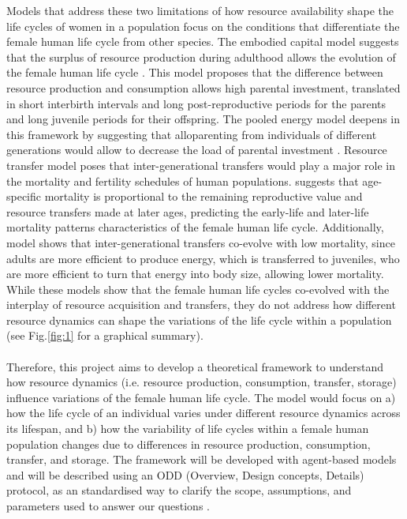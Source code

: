 \documentclass{article}
\begin{document}
Models that address these two limitations of how resource availability shape the life cycles of women in a population focus on the conditions that differentiate the female human life cycle from other species. The embodied capital model suggests that the surplus of resource production during adulthood allows the evolution of the female human life cycle \citep{kaplan2000theory}. This model proposes that the difference between resource production and consumption allows high parental investment, translated in short interbirth intervals and long post-reproductive periods for the parents and long juvenile periods for their offspring. The pooled energy model deepens in this framework by suggesting that alloparenting from individuals of different generations would allow to decrease the load of parental investment \citep{kramer2010pooled}. Resource transfer model poses that inter-generational transfers would play a major role in the mortality and fertility schedules of human populations. \cite{lee2003rethinking} suggests that age-specific mortality is proportional to the remaining reproductive value and resource transfers made at later ages, predicting the early-life and later-life mortality patterns characteristics of the female human life cycle. Additionally, \cite{chu2006co} model shows that inter-generational transfers co-evolve with low mortality, since adults are more efficient to produce energy, which is transferred to juveniles, who are more efficient to turn that energy into body size, allowing lower mortality. While these models show that the female human life cycles co-evolved with the interplay of resource acquisition and transfers, they do not address how different resource dynamics can shape the variations of the life cycle within a population (see Fig.\ref{fig:1} for a graphical summary).
\\\\
Therefore, this project aims to develop a theoretical framework to understand how resource dynamics (i.e. resource production, consumption, transfer, storage) influence variations of the female human life cycle. The model would focus on a) how the life cycle of an individual varies under different resource dynamics across its lifespan, and b) how the variability of life cycles within a female human population changes due to differences in resource production, consumption, transfer, and storage. The framework will be developed with agent-based models and will be described using an ODD (Overview, Design concepts, Details) protocol, as an standardised way to clarify the scope, assumptions, and parameters used to answer our questions \citep{grimm2006standard,grimm2020odd}.
\end{document}
